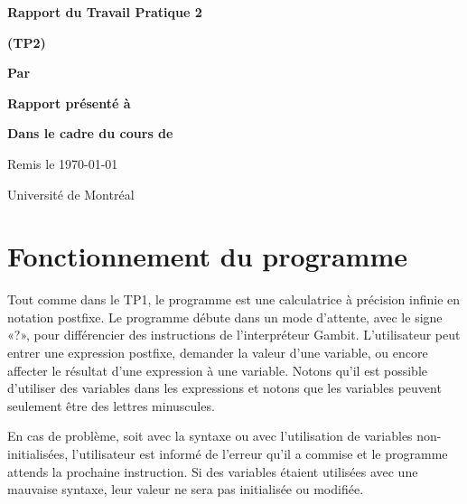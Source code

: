 \documentclass[letterpaper,12pt]{scrartcl}
\begin{document}
	\begin{center}
		\vspace{2cm}

		{\Huge\bf\sf Rapport du Travail Pratique 2}

		\vspace{0.5cm}

		{\bf\sf (TP2)}

		\vspace{4cm}

		{\bf\sf Par}

		\vspace{0.5cm}{\large\bf\sf Sulliman Aïad et François Poitras}

		\vspace{2cm}

		{\bf\sf Rapport présenté à}

		\vspace{0.5cm}{\large\bf\sf M. Marc  Feeley}

		\vspace{2cm}

		{\bf\sf Dans le cadre du cours de}

		\vspace{0.5cm}{\large\bf\sf Concepts des langages de programmation (IFT2035)}

		\vspace{\fill}
		Remis le \today

		\vspace{0.5cm}Université de Montréal
	\end{center}
	
	\newpage

	\pagestyle{cb}
	
	\tableofcontents

	\newpage
	
	\section{Fonctionnement du programme}
	Tout comme dans le TP1, le programme est une calculatrice à précision infinie en notation postfixe. Le programme débute dans un mode d'attente, avec le signe «?», pour différencier des instructions de l'interpréteur Gambit. L'utilisateur peut entrer une expression postfixe, demander la valeur d'une variable, ou encore affecter le résultat d'une expression à une variable. Notons qu'il est possible d'utiliser des variables dans les expressions et notons que les variables peuvent seulement être des lettres minuscules.

		En cas de problème, soit avec la syntaxe ou avec l'utilisation de variables non-initialisées, l'utilisateur est informé de l'erreur qu'il a commise et le programme attends la prochaine instruction. Si des variables étaient utilisées avec une mauvaise syntaxe, leur valeur ne sera pas initialisée ou modifiée.
	
\end{document}
